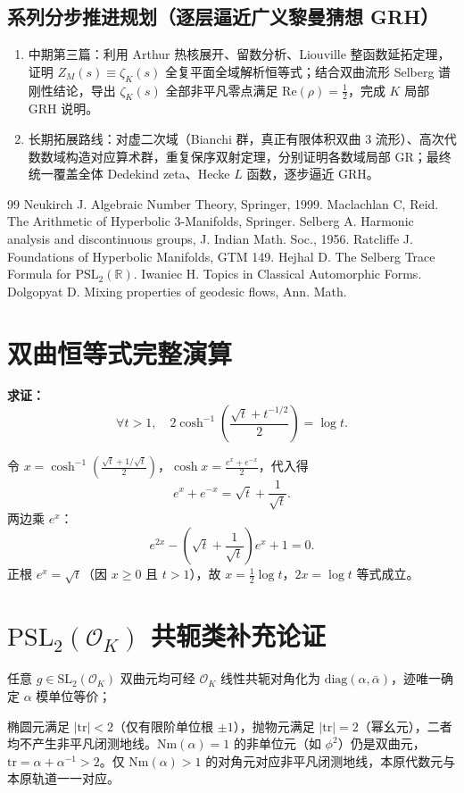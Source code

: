 \documentclass[12pt,a4paper]{article}
\begin{document}
\subsection{系列分步推进规划（逐层逼近广义黎曼猜想 GRH）}

\begin{enumerate}[label=\arabic*.]
\item 中期第三篇：利用 Arthur 热核展开、留数分析、Liouville 整函数延拓定理，证明 $Z_M(s) \equiv \zeta_K(s)$ 全复平面全域解析恒等式；结合双曲流形 Selberg 谱刚性结论，导出 $\zeta_K(s)$ 全部非平凡零点满足 $\mathrm{Re}(\rho) = \frac{1}{2}$，完成 $K$ 局部 GRH 说明。
\item 长期拓展路线：对虚二次域（Bianchi 群，真正有限体积双曲 3 流形）、高次代数数域构造对应算术群，重复保序双射定理，分别证明各数域局部 GR；最终统一覆盖全体 Dedekind zeta、Hecke $L$ 函数，逐步逼近 GRH。
\end{enumerate}

\begin{thebibliography}{99}
 Neukirch J. Algebraic Number Theory, Springer, 1999.
 Maclachlan C, Reid. The Arithmetic of Hyperbolic 3-Manifolds, Springer.
 Selberg A. Harmonic analysis and discontinuous groups, J. Indian Math. Soc., 1956.
 Ratcliffe J. Foundations of Hyperbolic Manifolds, GTM 149.
 Hejhal D. The Selberg Trace Formula for $\mathrm{PSL}_2(\mathbb{R})$.
 Iwaniec H. Topics in Classical Automorphic Forms.
 Dolgopyat D. Mixing properties of geodesic flows, Ann. Math.
\end{thebibliography}

\appendix

\section{双曲恒等式完整演算}

\textbf{求证：}
\[
\forall t > 1, \quad 2\cosh^{-1}\left(\frac{\sqrt{t} + t^{-1/2}}{2}\right) = \log t.
\]

令 $x = \cosh^{-1}\left(\frac{\sqrt{t} + 1/\sqrt{t}}{2}\right)$，$\cosh x = \frac{e^x + e^{-x}}{2}$，代入得
\[
e^x + e^{-x} = \sqrt{t} + \frac{1}{\sqrt{t}}.
\]
两边乘 $e^x$：
\[
e^{2x} - \left(\sqrt{t} + \frac{1}{\sqrt{t}}\right)e^x + 1 = 0.
\]
正根 $e^x = \sqrt{t}$（因 $x \geq 0$ 且 $t > 1$），故 $x = \frac{1}{2}\log t$，$2x = \log t$ 等式成立。

\section{$\mathrm{PSL}_2(\mathcal{O}_K)$ 共轭类补充论证}

任意 $g \in \mathrm{SL}_2(\mathcal{O}_K)$ 双曲元均可经 $\mathcal{O}_K$ 线性共轭对角化为 $\mathrm{diag}(\alpha, \bar{\alpha})$，迹唯一确定 $\alpha$ 模单位等价；

椭圆元满足 $|\mathrm{tr}| < 2$（仅有限阶单位根 $\pm 1$），抛物元满足 $|\mathrm{tr}| = 2$（幂幺元），二者均不产生非平凡闭测地线。$\mathrm{Nm}(\alpha) = 1$ 的非单位元（如 $\phi^2$）仍是双曲元，$\mathrm{tr} = \alpha + \alpha^{-1} > 2$。仅 $\mathrm{Nm}(\alpha) > 1$ 的对角元对应非平凡闭测地线，本原代数元与本原轨道一一对应。
\end{document}

